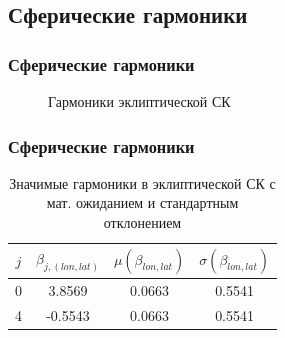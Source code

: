 \documentclass[12pt,aspectratio=43]{beamer}
\begin{document}
\begin{frame}
\begin{figure}[H]
\end{figure}
\end{frame}


\subsection{Сферические гармоники}\label{sistem}  
\begin{frame}[<alignment>]
\frametitle{Сферические гармоники}

\begin{figure}[h!]
\caption{Гармоники эклиптической СК}
\label{img:sf_j}
\end{figure}
\end{frame}	

\begin{frame}[<alignment>]
\frametitle{Сферические гармоники}
\begin{table}[h]
\centering
\caption{Значимые гармоники в эклиптической СК с мат. ожиданием и стандартным отклонением}
\label{tabular:sf_04}
\begin{tabular}{|c|c|c|c|}
\hline 	
$j$ &$\beta_{j,(lon,lat)}$ & $\mu(\beta_{lon,lat})$ & $\sigma(\beta_{lon,lat})$\\
\hline 	
0 &3.8569 &0.0663 &0.5541\\
4 &-0.5543 &0.0663 &0.5541\\
\hline 	
\end{tabular}
\end{table}
\end{frame}	
\end{document}
